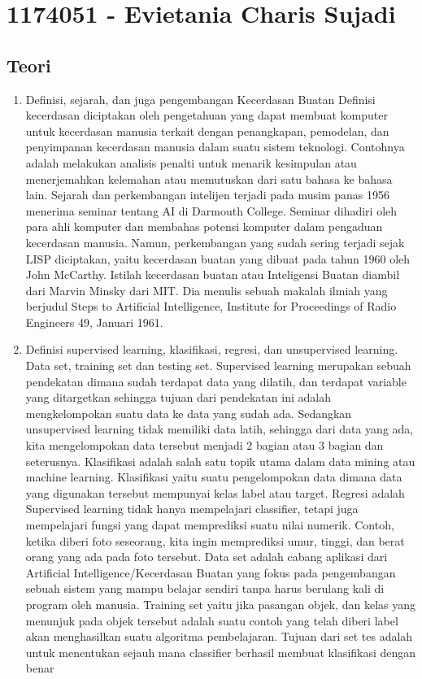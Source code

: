 \section{1174051 - Evietania Charis Sujadi}
\subsection{Teori}
\begin{enumerate}
\item Definisi, sejarah, dan juga pengembangan Kecerdasan Buatan
\subitem Definisi kecerdasan diciptakan oleh pengetahuan yang dapat membuat komputer untuk kecerdasan manusia terkait dengan penangkapan, pemodelan, dan penyimpanan kecerdasan manusia dalam suatu sistem teknologi. Contohnya adalah melakukan analisis penalti untuk menarik kesimpulan atau menerjemahkan kelemahan atau memutuskan dari satu bahasa ke bahasa lain.
\subitem Sejarah dan perkembangan intelijen terjadi pada musim panas 1956 menerima seminar tentang AI di Darmouth College. Seminar dihadiri oleh para ahli komputer dan membahas potensi komputer dalam pengaduan kecerdasan manusia. Namun, perkembangan yang sudah sering terjadi sejak LISP diciptakan, yaitu kecerdasan buatan yang dibuat pada tahun 1960 oleh John McCarthy. Istilah kecerdasan buatan atau Inteligensi Buatan diambil dari Marvin Minsky dari MIT. Dia menulis sebuah makalah ilmiah yang berjudul Steps to Artificial Intelligence, Institute for Proceedings of Radio Engineers 49, Januari 1961. 
\item  Definisi supervised learning, klasifikasi, regresi, dan unsupervised learning. Data set, training set dan testing set. 
\subitem Supervised learning merupakan sebuah pendekatan dimana sudah terdapat data yang dilatih, dan terdapat variable yang ditargetkan sehingga tujuan dari pendekatan ini adalah mengkelompokan suatu data ke data yang sudah ada. Sedangkan unsupervised learning tidak memiliki data latih, sehingga dari data yang ada, kita mengelompokan data tersebut menjadi 2 bagian atau 3 bagian dan seterusnya.
\subitem Klasifikasi adalah salah satu topik utama dalam data mining atau machine learning. Klasifikasi yaitu suatu pengelompokan data dimana data yang digunakan tersebut mempunyai kelas label atau target.
\subitem Regresi adalah Supervised learning tidak hanya mempelajari classifier, tetapi juga mempelajari fungsi yang dapat memprediksi suatu nilai numerik. Contoh, ketika diberi foto seseorang, kita ingin memprediksi umur, tinggi, dan berat orang yang ada pada foto tersebut.
\subitem Data set adalah cabang aplikasi dari Artificial Intelligence/Kecerdasan Buatan yang fokus pada pengembangan sebuah sistem yang mampu belajar sendiri tanpa harus berulang kali di program oleh manusia.
\subitem Training set yaitu jika pasangan objek, dan kelas yang menunjuk pada objek tersebut adalah suatu contoh yang telah diberi label akan menghasilkan suatu algoritma pembelajaran.
\subitem Tujuan dari set tes adalah untuk menentukan sejauh mana classifier berhasil membuat klasifikasi dengan benar
\end{enumerate}
